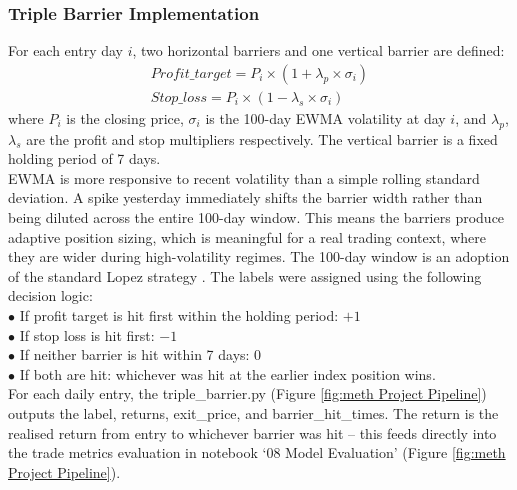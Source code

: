 \subsubsection{Triple Barrier Implementation}
For each entry day $i$, two horizontal barriers and one vertical barrier are defined:
\begin{gather}
Profit\_target =  P_i \times (1 + \lambda_p \times \sigma_i)\label{eq: tp profit} \\
Stop\_loss =  P_i \times (1 - \lambda_s \times \sigma_i)\label{eq: tp loss}
\end{gather}
where $P_i$ is the closing price, $\sigma_i$ is the 100-day EWMA volatility at day $i$, and $\lambda_p$, $\lambda_s$ are the profit and stop multipliers respectively. The vertical barrier is a fixed holding period of 7 days.\\
EWMA is more responsive to recent volatility than a simple rolling standard deviation. A spike yesterday immediately shifts the barrier width rather than being diluted across the entire 100-day window. This means the barriers produce adaptive position sizing, which is meaningful for a real trading context, where they are wider during high-volatility regimes. The 100-day window is an adoption of the standard Lopez strategy \cite{lopezdepradoAdvancesFinancialMachine2018}.
The labels were assigned using the following decision logic:\\
$\bullet$ If profit target is hit first within the holding period: $+1$\\
$\bullet$ If stop loss is hit first: $-1$\\
$\bullet$ If neither barrier is hit within 7 days: 0\\
$\bullet$ If both are hit: whichever was hit at the earlier index position wins.\\
For each daily entry, the triple\_barrier.py (Figure \ref{fig:meth Project Pipeline}) outputs the label, returns, exit\_price, and barrier\_hit\_times. The return is the realised return from entry to whichever barrier was hit -- this feeds directly into the trade metrics evaluation in notebook ‘08 Model Evaluation’ (Figure \ref{fig:meth Project Pipeline}).
